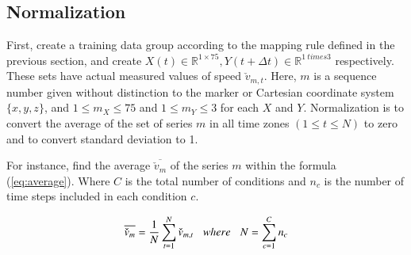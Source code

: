 \documentclass{sigchi}
\begin{document}
\subsection{Normalization}


First, create a training data group according to the mapping rule defined in the previous section, and create $ X (t) \in \mathbb {R} ^ {1 \times 75}, Y (t + \Delta t) \in \mathbb {R} ^ {1 \ times 3} $ respectively. These sets have actual measured values of speed $ \check {v}_{m, t} $. Here, $ m $ is a sequence number given without distinction to the marker or Cartesian coordinate system $ \{x, y, z \} $, and $ 1 \leq m_X \leq 75$ and $ 1 \leq m_Y \leq 3 $ for each $ X $ and $ Y $. Normalization is to convert the average of the set of series $ m $ in all time zones $ (1 \leq t \leq N) $ to zero and to convert standard deviation to 1.

For instance, find the average $ \overline {\check {v}_{m}} $ of the series $ m $ within the formula (\ref{eq:average}). Where $ C $ is the total number of conditions and $ n_c $ is the number of time steps included in each condition $ c $.

\begin{equation}
\overline{\check{v}_{m}} = \frac{1}{N}\sum^{N}_{t=1}\check{v}_{m,t} 
 \hspace{3mm} where  \hspace{3mm}
N=\sum^{C}_{c=1} n_c 
\label{eq:average}
\end{equation}
\end{document}
